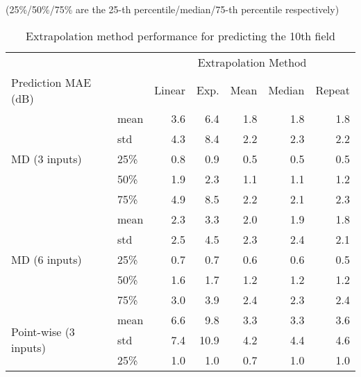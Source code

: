 \begin{table}[t]
\centering
\caption[Extrapolation method performance for predicting the 10th field]{Extrapolation method performance for predicting the 10th field}
(25\%/50\%/75\% are the 25-th percentile/median/75-th percentile respectively)
\begin{tabular}{@{}llrrrrr}
	\toprule
	                                                  &      &   \multicolumn{5}{c}{Extrapolation Method}    \\
	\cmidrule{3-7}                      
	Prediction \ac{MAE} (dB)              &      & Linear & Exp. & Mean & Median & Repeat \\ \midrule
	\multirow{5}{*}{MD (3 inputs)}         & mean &    3.6 &         6.4 &  1.8 &    1.8 &    1.8 \\
	                                                  & std  &    4.3 &         8.4 &  2.2 &    2.3 &    2.2 \\
	                                                  & 25\% &    0.8 &         0.9 &  0.5 &    0.5 &    0.5 \\
	                                                  & 50\% &    1.9 &         2.3 &  1.1 &    1.1 &    1.2 \\
	                                                  & 75\% &    4.9 &         8.5 &  2.2 &    2.1 &    2.3 \\ \midrule
	\multirow{5}{*}{MD (6 inputs)}         & mean &    2.3 &         3.3 &  2.0 &    1.9 &    1.8 \\
	                                                  & std  &    2.5 &         4.5 &  2.3 &    2.4 &    2.1 \\
	                                                  & 25\% &    0.7 &         0.7 &  0.6 &    0.6 &    0.5 \\
	                                                  & 50\% &    1.6 &         1.7 &  1.2 &    1.2 &    1.2 \\
	                                                  & 75\% &    3.0 &         3.9 &  2.4 &    2.3 &    2.4 \\ \midrule
	\multirow{5}{*}{Point-wise (3 inputs)} & mean &    6.6 &         9.8 &  3.3 &    3.3 &    3.6 \\
	                                                  & std  &    7.4 &        10.9 &  4.2 &    4.4 &    4.6 \\
	                                                  & 25\% &    1.0 &         1.0 &  0.7 &    1.0 &    1.0 \\

\end{tabular}
\end{table}
